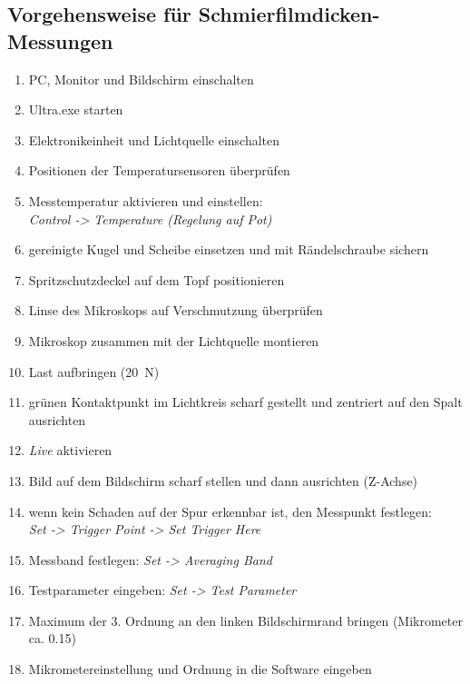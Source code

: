 \begin{appendices}
    \section{Vorgehensweise für Schmierfilmdicken-Messungen \cite{surborg_2007}}
        \begin{enumerate}
            \item PC, Monitor und Bildschirm einschalten
            \item Ultra.exe starten
            \item Elektronikeinheit und Lichtquelle einschalten
            \item Positionen der Temperatursensoren überprüfen
            \item Messtemperatur aktivieren und einstellen: \\
                \textit{Control -> Temperature (Regelung auf Pot)}
            \item gereinigte Kugel und Scheibe einsetzen und mit Rändelschraube sichern
            \item Spritzschutzdeckel auf dem Topf positionieren
            \item Linse des Mikroskops auf Verschmutzung überprüfen
            \item Mikroskop zusammen mit der Lichtquelle montieren
            \item Last aufbringen (\SI{20}{\newton})
            \item grünen Kontaktpunkt im Lichtkreis scharf gestellt und zentriert auf den Spalt ausrichten
            \item \textit{Live} aktivieren
            \item Bild auf dem Bildschirm scharf stellen und dann ausrichten (Z-Achse)
            \item wenn kein Schaden auf der Spur erkennbar ist, den Messpunkt festlegen: \\
                \textit{Set -> Trigger Point -> Set Trigger Here}
            \item Messband festlegen: \textit{Set -> Averaging Band}
            \item Testparameter eingeben: \textit{Set -> Test Parameter}
            \item Maximum der 3. Ordnung an den linken Bildschirmrand bringen (Mikrometer ca. \num{0.15})
            \item Mikrometereinstellung und Ordnung in die Software eingeben

\end{enumerate}
\end{appendices}
